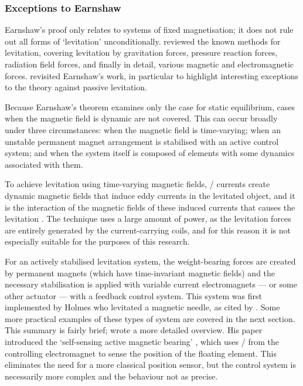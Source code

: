 \documentclass[11pt,a4paper]{memoir}
\begin{document}
\subsubsection{Exceptions to Earnshaw}

Earnshaw's proof only relates to systems of fixed magnetisation; it does not rule out all forms of `levitation' unconditionally.
\textcite{boerdijk1956a} reviewed the known methods for levitation, covering levitation by gravitation forces, pressure reaction forces, radiation field forces, and finally in detail, various magnetic and electromagnetic forces.
\textcite{bassani2006-meccanica} revisited Earnshaw's work, in particular to highlight interesting exceptions to the theory against passive levitation.

Because Earnshaw's theorem examines only the case for static equilibrium, cases when the magnetic field is dynamic are not covered.
This can occur broadly under three circumstances: when the magnetic field is time-varying; when an unstable permanent magnet arrangement is stabilised with an active control system; and when the system itself is composed of elements with some dynamics associated with them.

To achieve levitation using time-varying magnetic fields, \AC/ currents create dynamic magnetic fields that induce eddy currents in the levitated object, and it is the interaction of the magnetic fields of these induced currents that causes the levitation \cite{laithwaite1965}.
The technique uses a large amount of power, as the levitation forces are entirely generated by the current-carrying coils, and for this reason it is not especially suitable for the purposes of this research.

For an actively stabilised levitation system, the weight-bearing forces are created by permanent magnets (which have time-invariant magnetic fields) and the necessary stabilisation is applied with variable current electromagnets — or some other actuator — with a feedback control system.
This system was first implemented by Holmes who levitated a magnetic needle, as cited by \textcite{boerdijk1956a}.
Some more practical examples of these types of system are covered in the next section.
This summary is fairly brief; \textcite{bleuler1992} wrote a more detailed overview.
His paper introduced the `self-sensing active magnetic bearing' \cite{vischer1993}, which uses \backemf/ from the controlling electromagnet to sense the position of the floating element.
This eliminates the need for a more classical position sensor,
but the control system is necessarily more complex and the behaviour not as precise.
\end{document}

